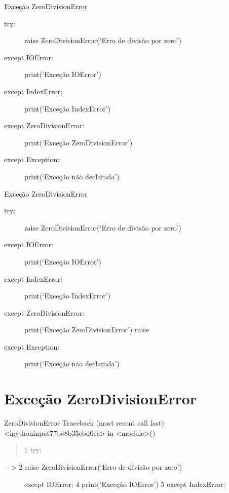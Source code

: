 \documentclass[letterpaper,10pt,brazil]{sphinxmanual}
\begin{document}
Exceção ZeroDivisionError
\begin{description}
\item[{try:}] \leavevmode
raise ZeroDivisionError(‘Erro de divisão por zero’)

\item[{except IOError:}] \leavevmode
print(‘Exceção IOError’)

\item[{except IndexError:}] \leavevmode
print(‘Exceção IndexError’)

\item[{except ZeroDivisionError:}] \leavevmode
print(‘Exceção ZeroDivisionError’)

\item[{except Exception:}] \leavevmode
print(‘Exceção não declarada’)

\end{description}

Exceção ZeroDivisionError
\begin{description}
\item[{try:}] \leavevmode
raise ZeroDivisionError(‘Erro de divisão por zero’)

\item[{except IOError:}] \leavevmode
print(‘Exceção IOError’)

\item[{except IndexError:}] \leavevmode
print(‘Exceção IndexError’)

\item[{except ZeroDivisionError:}] \leavevmode
print(‘Exceção ZeroDivisionError’)
raise

\item[{except Exception:}] \leavevmode
print(‘Exceção não declarada’)

\end{description}


\chapter{Exceção ZeroDivisionError}
\label{\detokenize{content/except:excecao-zerodivisionerror}}
ZeroDivisionError                         Traceback (most recent call last)
\textless{}ipython\sphinxhyphen{}input\sphinxhyphen{}77\sphinxhyphen{}be8b35cbd0cc\textgreater{} in \textless{}module\textgreater{}()
\begin{quote}

1 try:
\end{quote}
\begin{description}
\item[{—\sphinxhyphen{}\textgreater{} 2     raise ZeroDivisionError(‘Erro de divisão por zero’)}]  except IOError:
4     print(‘Exceção IOError’)
5 except IndexError:

\end{description}
\end{document}
